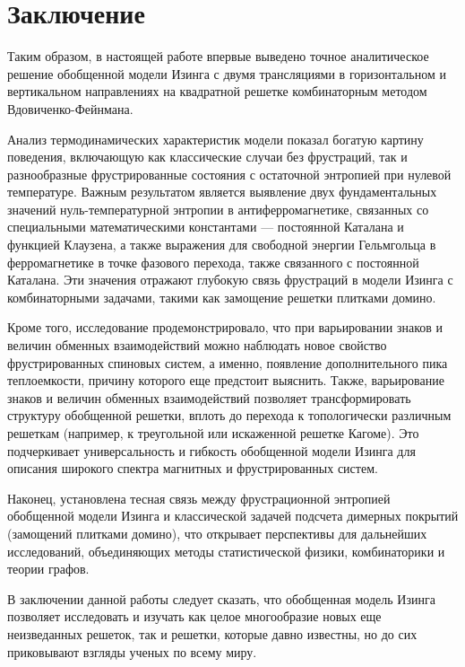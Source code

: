 \documentclass[utf8,12pt]{jetp}
\begin{document}
\section{Заключение}
		
Таким образом, в настоящей работе впервые выведено точное аналитическое решение обобщенной модели Изинга с двумя трансляциями в горизонтальном и вертикальном направлениях на квадратной решетке комбинаторным методом Вдовиченко-Фейнмана. 

Анализ термодинамических характеристик модели показал богатую картину поведения, включающую как классические случаи без фрустраций, так и разнообразные фрустрированные состояния с остаточной энтропией при нулевой температуре. Важным результатом является выявление двух фундаментальных значений нуль-температурной энтропии в антиферромагнетике, связанных со специальными математическими константами — постоянной Каталана и функцией Клаузена, а также выражения для свободной энергии Гельмгольца в ферромагнетике в точке фазового перехода, также связанного с постоянной Каталана. Эти значения отражают глубокую связь фрустраций в модели Изинга с комбинаторными задачами, такими как замощение решетки плитками домино.

Кроме того, исследование продемонстрировало, что при варьировании знаков и величин обменных взаимодействий можно наблюдать новое свойство фрустрированных спиновых систем, а именно, появление дополнительного пика теплоемкости, причину которого еще предстоит выяснить. Также, варьирование знаков и величин обменных взаимодействий позволяет трансформировать структуру обобщенной решетки, вплоть до перехода к топологически различным решеткам (например, к треугольной или искаженной решетке Кагоме). Это подчеркивает универсальность и гибкость обобщенной модели Изинга для описания широкого спектра магнитных и фрустрированных систем.

Наконец, установлена тесная связь между фрустрационной энтропией обобщенной модели Изинга и классической задачей подсчета димерных покрытий (замощений плитками домино), что открывает перспективы для дальнейших исследований, объединяющих методы статистической физики, комбинаторики и теории графов. 

В заключении данной работы следует сказать, что обобщенная модель Изинга позволяет исследовать и изучать как целое многообразие новых еще неизведанных решеток, так и решетки, которые давно известны, но до сих приковывают взгляды ученых по всему миру.
		
	
\end{document}
